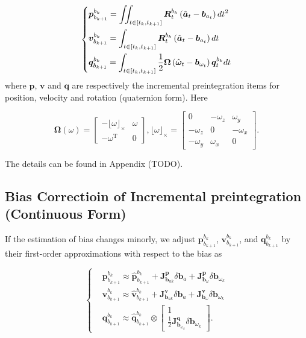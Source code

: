 \documentclass[12pt]{article}   %
\begin{document}
\begin{equation}
\centering
\left\{
\begin{aligned}
&\bm{p}_{b_{k+1}}^{b_k}=\iint_{t\in\left[t_k,t_{k+1}\right]}\bm{R}_{t}^{b_k}\left(\hat{\bm{a}}_{t}-\bm{b}_{a_t}\right)dt^2\\
&\bm{v}_{b_{k+1}}^{b_k}=\int_{t\in\left[t_k,t_{k+1}\right]}\bm{R}_{t}^{b_k}\left(\hat{\bm{a}}_{t}-\bm{b}_{a_t}\right)dt \\
&\bm{q}_{b_{k+1}}^{b_k}=\int_{t\in\left[t_k,t_{k+1}\right]}\frac{1}{2}\bm{\Omega}\left(\hat{\bm{\omega}}_t-\bm{b}_{\omega_t}\right)\bm{q}_t^{b_k}dt
\end{aligned}
\right.
\label{eq.preintegration}
\end{equation}
where $\bm{p}$, $\bm{v}$ and $\bm{q}$ are respectively the
incremental preintegration items for position, velocity and rotation (quaternion
form). Here 

\begin{equation}
\bm{\Omega}\left( \omega \right) = 
\begin{bmatrix}
	- \lfloor \omega \rfloor _ \times & \omega \\
	- \omega ^{\mathrm{T}} & 0
\end{bmatrix}, \lfloor \omega \rfloor _ \times = 
\begin{bmatrix}
	0 & - \omega_z & \omega_y \\
	- \omega_z & 0 & - \omega_x \\
	- \omega_y & \omega_x & 0
\end{bmatrix}.
\label{eq.rot_incremental}
\end{equation}

The details can be found in Appendix (TODO).


\subsection{Bias Correctioin of Incremental preintegration (Continuous Form)}

If the estimation of bias changes minorly, we adjust $\bm{p}_{b_{k+1}}^{b_k}$, $\bm{v}_{b_{k+1}}^{b_k}$, and $\bm{q}_{b_{k+1}}^{b_k}$ by their first-order approximations with respect to the bias as

\begin{equation}
\left\{
\begin{aligned}
&\bm{p}_{b_{k+1}}^{b_k}\approx\hat{\bm{p}}_{b_{k+1}}^{b_k}+\bm{J}^{\bm{p}}_{\bm{b}_{ak}}\delta\bm{b}_a+\bm{J}^{\bm{p}}_{\bm{b}_\omega}\delta\bm{b}_{\omega_k} \\
&\bm{v}_{b_{k+1}}^{b_k}\approx\hat{\bm{v}}_{b_{k+1}}^{b_k}+\bm{J}^{\bm{v}}_{\bm{b}_{ak}}\delta\bm{b}_a+\bm{J}^{\bm{v}}_{\bm{b}_\omega}\delta\bm{b}_{\omega_k} \\
&\bm{q}_{b_{k+1}}^{b_k}\approx\hat{\bm{q}}_{b_{k+1}}^{b_k}\otimes 
	\begin{bmatrix}
		1 \\ \frac{1}{2}\bm{J}^{\bm{q}}_{\bm{b}_{\omega_k}}\delta\bm{b}_{\omega_k}
	\end{bmatrix}.
\end{aligned}
\right.
\label{eq.bias_correction}
\end{equation}
\end{document}
